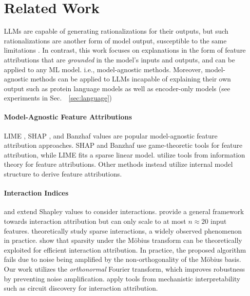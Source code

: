 \section{Related Work}
\label{sec:related_work}

LLMs are capable of generating rationalizations for their outputs, but such rationalizations are another form of model output, susceptible to the same limitations \cite{sarkar2024large}.
%
In contrast, this work focuses on explanations in the form of feature attributions that are \emph{grounded} in the model's inputs and outputs, and can be applied to any ML model. i.e., model-agnostic methods. 
%
Moreover, model-agnostic methods can be applied to LLMs incapable of explaining their own output such as protein language models as well as encoder-only models (see experiments in Sec.~\ \ref{sec:language})

\paragraph{Model-Agnostic Feature Attributions} LIME \cite{ribeiro2016should}, SHAP \cite{Lundberg2017}, and Banzhaf values \cite{wang2023} are popular model-agnostic feature attribution approaches.
%
SHAP and Banzhaf use game-theoretic tools for feature attribution, while LIME fits a sparse linear model.
%
%
\citet{chen2018learning} utilize tools from information theory for feature attributions. 
%
Other methods 
\cite{sundararajan2017axiomatic,binder2016layerwiserelevancepropagationneural} instead utilize internal model structure to derive feature attributions. 


\vspace{-2pt}
\paragraph{Interaction Indices} \citet{tsai2023faith} and \citet{dhamdhere2019shapley} extend Shapley values to consider interactions. 
%
\citet{fumagalli2023shapiq} provide a general framework towards interaction attribution but can only scale to at most $n \approx 20$ input features. 
%
\citet{ren2023can, ren2024towards} theoretically study sparse interactions, a widely observed phenomenon in practice. 
%
\citet{kang2024learning} show that sparsity under the M\"obius transform \cite{harsanyi1958bargaining} can be theoretically exploited for efficient interaction attribution. 
%
In practice, the proposed algorithm fails due to noise being amplified by the non-orthogonality of the M\"obius basis.
%
Our work utilizes the \emph{orthonormal} Fourier transform, which improves robustness by preventing noise amplification. 
%
\citet{hsu2024efficientautomatedcircuitdiscovery} apply tools from 
mechanistic interpretability such as circuit discovery for interaction attribution.


